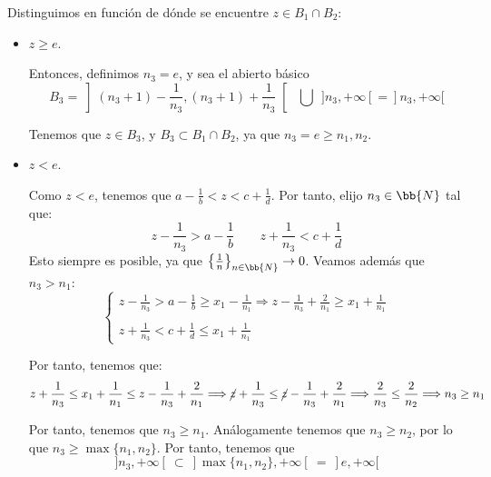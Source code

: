 \begin{ejercicio}
\begin{enumerate}[label=\alph*)]
\begin{enumerate}
            Distinguimos en función de dónde se encuentre $z\in B_1\cap B_2$:
            \begin{itemize}
                \item $z\geq e$.

                Entonces, definimos $n_3=e$, y sea el abierto básico $$B_3=\left](n_3+1)-\frac{1}{n_3}, (n_3+1)+\frac{1}{n_3}\right[~~ \bigcup ~~]n_3,+\infty[ = ]n_3,+\infty[$$

                Tenemos que $z\in B_3$, y $B_3\subset B_1\cap B_2$, ya que $n_3=e\geq n_1,n_2$.

                \item $z<e$.
                
                Como $z<e$, tenemos que $a-\frac{1}{b}<z<c+\frac{1}{d}$. Por tanto, elijo $n_3\in \bb{N}$ tal que:
                \begin{equation*}
                    z-\frac{1}{n_3} > a-\frac{1}{b}
                    \qquad 
                    z+\frac{1}{n_3} < c+\frac{1}{d}
                \end{equation*}
                Esto siempre es posible, ya que $\left\{\frac{1}{n}\right\}_{n\in \bb{N}}\to 0$. Veamos además que $n_3>n_1$:
                \begin{equation*}
                    \left\{
                    \begin{array}{l}
                        z-\frac{1}{n_3}>a-\frac{1}{b}\geq x_1-\frac{1}{n_1} \Longrightarrow z-\frac{1}{n_3}+\frac{2}{n_1} \geq x_1+\frac{1}{n_1}
                        \\ \\
                        z+\frac{1}{n_3}<c+\frac{1}{d}\leq x_1+\frac{1}{n_1}
                    \end{array}
                    \right.
                \end{equation*}

                Por tanto, tenemos que:
                \begin{equation*}
                    z+\frac{1}{n_3}\leq x_1+\frac{1}{n_1} \leq z-\frac{1}{n_3}+\frac{2}{n_1} \Longrightarrow
                    \cancel{z}+\frac{1}{n_3} \leq \cancel{z}-\frac{1} {n_3}+\frac{2}{n_1}
                    \Longrightarrow \frac{2}{n_3}\leq \frac{2}{n_2} \Longrightarrow n_3\geq n_1
                \end{equation*}

                Por tanto, tenemos que $n_3\geq n_1$. Análogamente tenemos que $n_3\geq n_2$, por lo que $n_3\geq \max \{n_1,n_2\}$. Por tanto, tenemos que $$]n_3,+\infty[~\subset~ ]\max\{n_1,n_2\},+\infty[ ~=~ ]e,+\infty[$$


\end{itemize}
\end{enumerate}
\end{enumerate}
\end{ejercicio}
